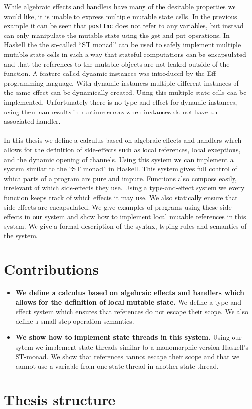 While algebraic effects and handlers have many of the desirable properties we would like, it is unable to express multiple mutable state cells.
In the previous example it can be seen that \texttt{postInc} does not refer to any variables, but instead can only manipulate the mutable state using the get and put operations.
In Haskell the the so-called ``ST monad''\cite{runst} can be used to safely implement multiple mutable state cells in such a way that stateful computations can be encapsulated and that the references to the mutable objects are not leaked outside of the function. 
A feature called dynamic instances was introduced by the Eff programming language\cite{eff1}.
With dynamic instances multiple different instances of the same effect can be dynamically created.
Using this multiple state cells can be implemented.
Unfortunately there is no type-and-effect for dynamic instances, using them can results in runtime errors when instances do not have an associated handler.
\\\\
In this thesis we define a calculus based on algebraic effects and handlers which allows for the definition of side-effects such as local references, local exceptions, and the dynamic opening of channels.
Using this system we can implement a system similar to the ``ST monad'' in Haskell.
This system gives full control of which parts of a program are pure and impure.
Functions also compose easily, irrelevant of which side-effects they use.
Using a type-and-effect system we every function keeps track of which effects it may use.
We also statically ensure that side-effects are encapsulated.
We give examples of programs using these side-effects in our system and show how to implement local mutable references in this system.
We give a formal description of the syntax, typing rules and semantics of the system.

\section{Contributions}
\begin{itemize}

\item \textbf{We define a calculus based on algebraic effects and handlers which allows for the definition of local mutable state.}
We define a type-and-effect system which ensures that references do not escape their scope.
We also define a small-step operation semantics.

\item \textbf{We show how to implement state threads in this system.}
Using our sytem we implement state threads similar to a monomorphic version Haskell's ST-monad.
We show that references cannot escape their scope and that we cannot use a variable from one state thread in another state thread.

\end{itemize}

\section{Thesis structure}
